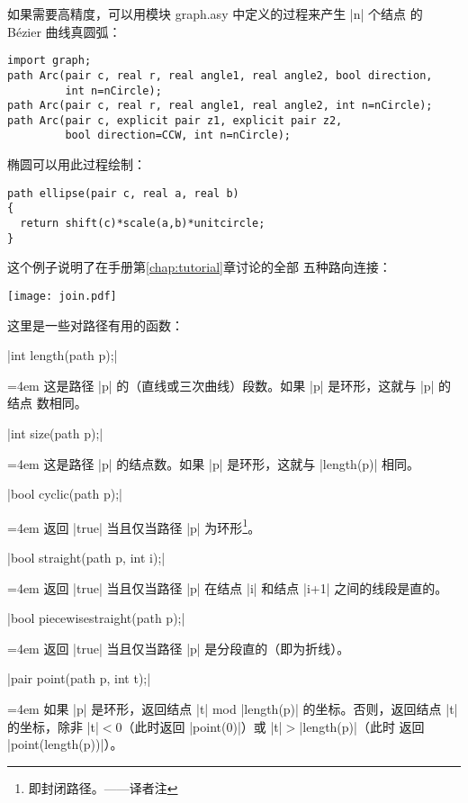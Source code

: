 \documentclass[nofonts,CJKnormalspaces]{ctexbook}[2009/05/20]
\makeatletter
\newenvironment{funclist}{\trivlist
  \parindent=0pt
\item[]
  \def\item{\medskip\par\leftskip=0pt}
  \def\go{\par\leftskip=4em}}
{\endtrivlist}
\newenvironment{typelist}{\itemize
  \let\old@item\@item
  \def\@item[##1]{\expandafter\old@item[\ttfamily\color{type!50!black}##1]}}
{\enditemize}
\newcommand*\prgname[1]{\textsf{#1}}
\newcommand\transnote[1]{\footnote{#1——译者注}}
\makeatother
\begin{document}
\begin{typelist}
如果需要高精度，可以用模块 \prgname{graph.asy} 中定义的过程来产生 |n| 个结点
的 Bézier 曲线真圆弧：
\begin{lstlisting}
import graph;
path Arc(pair c, real r, real angle1, real angle2, bool direction,
         int n=nCircle);
path Arc(pair c, real r, real angle1, real angle2, int n=nCircle);
path Arc(pair c, explicit pair z1, explicit pair z2,
         bool direction=CCW, int n=nCircle);
\end{lstlisting}

椭圆可以用此过程绘制：
\begin{lstlisting}
path ellipse(pair c, real a, real b)
{
  return shift(c)*scale(a,b)*unitcircle;
}
\end{lstlisting}

这个例子说明了在手册第\ref{chap:tutorial}章讨论的全部
五种路向连接：

\begin{center}
  \texttt{[image: join.pdf]}
\end{center}

这里是一些对路径有用的函数：
\begin{funclist}
\item |int length(path p);| \go
  这是路径 |p| 的（直线或三次曲线）段数。如果 |p| 是环形，这就与 |p| 的结点
  数相同。

\item |int size(path p);| \go
  这是路径 |p| 的结点数。如果 |p| 是环形，这就与 |length(p)| 相同。

\item |bool cyclic(path p);| \go
  返回 |true| 当且仅当路径 |p| 为环形\transnote{即封闭路径。}。

\item |bool straight(path p, int i);| \go
  返回 |true| 当且仅当路径 |p| 在结点 |i| 和结点 |i+1| 之间的线段是直的。

\item |bool piecewisestraight(path p);| \go
  返回 |true| 当且仅当路径 |p| 是分段直的（即为折线）。

\item |pair point(path p, int t);| \go
  如果 |p| 是环形，返回结点 |t| mod |length(p)| 的坐标。否则，返回结点 |t|
  的坐标，除非 |t|${}<0$（此时返回 |point(0)|）或 |t|${}>{}$|length(p)|（此时
  返回 |point(length(p))|）。


\end{funclist}
\end{typelist}
\end{document}
